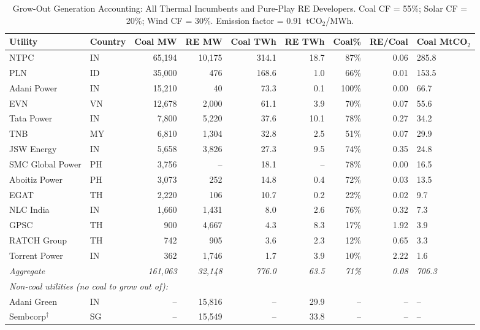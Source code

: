 \documentclass[review,3p,authoryear]{elsarticle}
\begin{document}
\begin{table}[H]
\centering
\caption{Grow-Out Generation Accounting: All Thermal Incumbents and Pure-Play RE Developers. Coal CF = 55\%; Solar CF = 20\%; Wind CF = 30\%. Emission factor = 0.91~tCO$_2$/MWh.}
\label{tab:growout_full}
\small
\begin{adjustbox}{max width=\linewidth}
\begin{tabular}{@{}llrrrrrrl@{}}
\toprule
\textbf{Utility} & \textbf{Country} & \textbf{Coal MW} & \textbf{RE MW} & \textbf{Coal TWh} & \textbf{RE TWh} & \textbf{Coal\%} & \textbf{RE/Coal} & \textbf{Coal MtCO$_2$} \\
\midrule
NTPC & IN & 65,194 & 10,175 & 314.1 & 18.7 & 87\% & 0.06 & 285.8 \\
PLN & ID & 35,000 & 476 & 168.6 & 1.0 & 66\% & 0.01 & 153.5 \\
Adani Power & IN & 15,210 & 40 & 73.3 & 0.1 & 100\% & 0.00 & 66.7 \\
EVN & VN & 12,678 & 2,000 & 61.1 & 3.9 & 70\% & 0.07 & 55.6 \\
Tata Power & IN & 7,800 & 5,220 & 37.6 & 10.1 & 78\% & 0.27 & 34.2 \\
TNB & MY & 6,810 & 1,304 & 32.8 & 2.5 & 51\% & 0.07 & 29.9 \\
JSW Energy & IN & 5,658 & 3,826 & 27.3 & 9.5 & 74\% & 0.35 & 24.8 \\
SMC Global Power & PH & 3,756 & -- & 18.1 & -- & 78\% & 0.00 & 16.5 \\
Aboitiz Power & PH & 3,073 & 252 & 14.8 & 0.4 & 72\% & 0.03 & 13.5 \\
EGAT & TH & 2,220 & 106 & 10.7 & 0.2 & 22\% & 0.02 & 9.7 \\
NLC India & IN & 1,660 & 1,431 & 8.0 & 2.6 & 76\% & 0.32 & 7.3 \\
GPSC & TH & 900 & 4,667 & 4.3 & 8.3 & 17\% & 1.92 & 3.9 \\
RATCH Group & TH & 742 & 905 & 3.6 & 2.3 & 12\% & 0.65 & 3.3 \\
Torrent Power & IN & 362 & 1,746 & 1.7 & 3.9 & 10\% & 2.22 & 1.6 \\
\midrule
\textit{Aggregate} & & \textit{161,063} & \textit{32,148} & \textit{776.0} & \textit{63.5} & \textit{71\%} & \textit{0.08} & \textit{706.3} \\
\midrule
\multicolumn{9}{l}{\textit{Non-coal utilities (no coal to grow out of):}} \\
Adani Green & IN & -- & 15,816 & -- & 29.9 & -- & -- & -- \\
Sembcorp$^{\dagger}$ & SG & -- & 15,549 & -- & 33.8 & -- & -- & -- \\

\end{tabular}
\end{adjustbox}
\end{table}
\end{document}
